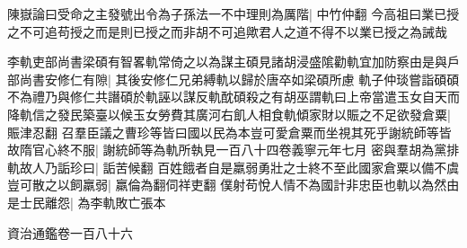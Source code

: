 陳嶽論曰受命之主發號出令為子孫法一不中理則為厲階|{
	中竹仲翻}
今高祖曰業已授之不可追苟授之而是則已授之而非胡不可追歟君人之道不得不以業已授之為誡哉

李軌吏部尚書梁碩有智畧軌常倚之以為謀主碩見諸胡浸盛隂勸軌宜加防察由是與戶部尚書安修仁有隙|{
	其後安修仁兄弟縛軌以歸於唐卒如梁碩所慮}
軌子仲琰嘗詣碩碩不為禮乃與修仁共譖碩於軌誣以謀反軌酖碩殺之有胡巫謂軌曰上帝當遣玉女自天而降軌信之發民築臺以候玉女勞費其廣河右飢人相食軌傾家財以賑之不足欲發倉粟|{
	賑津忍翻}
召羣臣議之曹珍等皆曰國以民為本豈可愛倉粟而坐視其死乎謝統師等皆故隋官心終不服|{
	謝統師等為軌所執見一百八十四卷義寧元年七月}
密與羣胡為黨排軌故人乃詬珍曰|{
	詬苦候翻}
百姓餓者自是羸弱勇壯之士終不至此國家倉粟以備不虞豈可散之以飼羸弱|{
	羸倫為翻伺祥吏翻}
僕射苟悅人情不為國計非忠臣也軌以為然由是士民離怨|{
	為李軌敗亡張本}


資治通鑑卷一百八十六


















































































